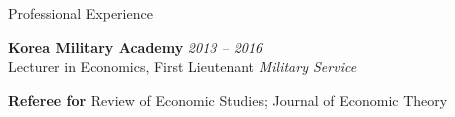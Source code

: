 
\begin{rSection}{Professional Experience}

{\bf Korea Military Academy} \hfill {\em 2013 -- 2016} \\[5pt] 
Lecturer in Economics, First Lieutenant \hfill {\em Military Service}

\medskip 

{\bf Referee for } Review of Economic Studies; Journal of Economic Theory

\end{rSection}
